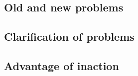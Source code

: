 \subsection{Old and new problems}

\subsection{Clarification of problems}

\subsection{Advantage of inaction}
